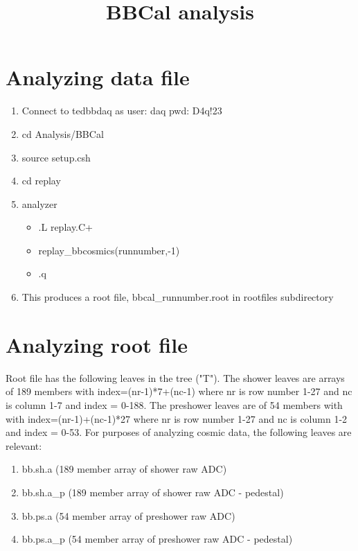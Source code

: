 \documentclass[]{article}
\title{BBCal analysis}
\author{}
\begin{document}
\maketitle

\begin{abstract}

\end{abstract}

\section{Analyzing data file}
\begin{enumerate}
	\item Connect to tedbbdaq as user: daq pwd: D4q!23
	\item cd Analysis/BBCal
	\item source setup.csh
	\item cd replay
	\item analyzer
\begin{itemize}
	\item .L replay.C+
	\item replay\_bbcosmics(runnumber,-1)
	\item .q
\end{itemize}
\item This produces a root file, bbcal\_runnumber.root in 	rootfiles subdirectory
\end{enumerate}

\section{Analyzing root file}
Root file has the following leaves in the tree ("T").
The shower leaves are arrays of 189 members with index=(nr-1)*7+(nc-1) where nr is row number 1-27 and nc is column 1-7 and index = 0-188.
The preshower leaves are of 54 members with with index=(nr-1)+(nc-1)*27 where nr is row number 1-27 and nc is column 1-2 and index = 0-53.
For purposes of analyzing cosmic data, the following leaves are relevant:
\begin{enumerate}
	\item bb.sh.a (189 member array of shower raw ADC)
	\item bb.sh.a\_p (189 member array of shower raw ADC - pedestal)
	\item bb.ps.a (54 member array of preshower raw ADC)
    \item bb.ps.a\_p (54 member array of preshower raw ADC - pedestal)
\end{enumerate}
\end{document}

